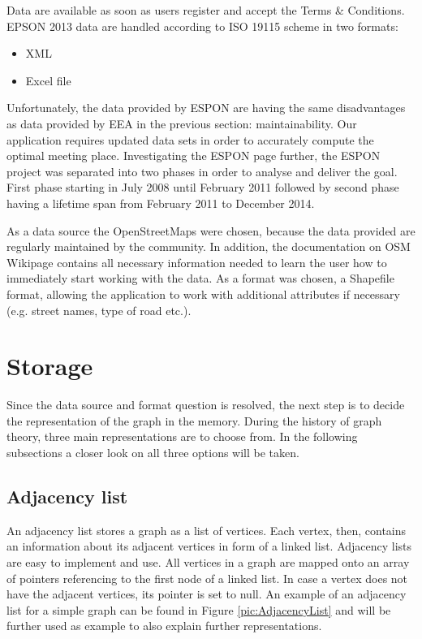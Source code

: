 \documentclass[thesis=M,english]{FITthesis}[2012/10/20]
\begin{document}
Data are available as soon as users register and accept the Terms \& Conditions. EPSON 2013 data are handled according to ISO 19115 scheme in two formats:

\begin{itemize}
\item XML
\item Excel file
\end{itemize}

Unfortunately, the data provided by ESPON are having the same disadvantages as data provided by EEA in the previous section: maintainability. Our application requires updated data sets in order to accurately compute the optimal meeting place. Investigating the ESPON page further, the ESPON project was separated into two phases in order to analyse and deliver the goal. First phase starting in July 2008 until February 2011 followed by second phase having a lifetime span from February 2011 to December 2014. 


As a data source the OpenStreetMaps were chosen, because the data provided are regularly maintained by the community. In addition, the documentation on OSM Wikipage contains all necessary information needed to learn the user how to immediately start working with the data. As a format was chosen, a Shapefile format, allowing the application to work with additional attributes if necessary (e.g. street names, type of road etc.).

\section{Storage}
\label{sec:storage}
Since the data source and format question is resolved, the next step is to decide the representation of the graph in the memory. During the history of graph theory, three main representations are to choose from. In the following subsections a closer look on all three options will be taken.

\subsection{Adjacency list}
An adjacency list stores a graph as a list of vertices. Each vertex, then, contains an information about its adjacent vertices in form of a linked list. 
Adjacency lists are easy to implement and use. 
All vertices in a graph are mapped onto an array of pointers referencing to the first node of a linked list. In case a vertex does not have the adjacent vertices, its pointer is set to null. 
An example of an adjacency list for a simple graph can be found in Figure \ref{pic:AdjacencyList} and will be further used as example to also explain further representations. 
\end{document}
